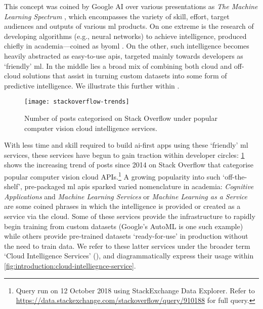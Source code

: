 This concept was coined by Google AI over various presentations as \textit{The Machine Learning Spectrum} \citep{Ortiz:2017wg,LaForge:2018tm,McGowen:2019vt}, which encompasses the variety of skill, effort, target audiences and outputs of various \gls{ml} products. On one extreme is the research of developing algorithms (e.g., neural networks) to achieve intelligence, produced chiefly in academia---coined as \gls{byoml} \citep{Ortiz:2017wg,McGowen:2019vt,Jimerson:2017vh}. On the other, such intelligence becomes heavily abstracted as easy-to-use \glspl{api}, targeted mainly towards developers as `friendly' \gls{ml}. In the middle lies a broad mix of combining both cloud and off-cloud solutions that assist in turning custom datasets into some form of predictive intelligence. We illustrate this further within .

\begin{figure}[t!]
\centering
\caption[Increasing interest in the developer community of computer vision APIs]{Number of posts categorised on Stack Overflow under popular computer vision cloud intelligence services.}
\label{fig:introduction:stackoverflow-trends}
\texttt{[image: stackoverflow-trends]}
\end{figure}

With less time and skill required to build \gls{ai}-first apps using these `friendly' \gls{ml} services,  these services have begun to gain traction within developer circles: \cref{fig:introduction:stackoverflow-trends} shows the increasing trend of posts since 2014 on Stack Overflow that categorise popular computer vision cloud APIs.\footnote{Query run on 12 October 2018 using StackExchange Data Explorer. Refer to \url{https://data.stackexchange.com/stackoverflow/query/910188} for full query.} A growing popularity into such `off-the-shelf', pre-packaged \gls{ml} \glspl{api} sparked varied nomenclature in academia: \textit{Cognitive Applications} and \textit{Machine Learning Services} \citep{Hwang:2017tr} or \textit{Machine Learning as a Service} \citep{Ribeiro:2015dz} are some coined phrases in which the intelligence is provided or created as a service via the cloud. Some of these services provide the infrastructure to rapidly begin training from custom datasets (Google's AutoML is one such example) while others provide pre-trained datasets `ready-for-use' in production without the need to train data. We refer to these latter services under the broader term `Cloud Intelligence Services' (), and diagrammatically express their usage within \cref{fig:introduction:cloud-intelliegnce-service}.


